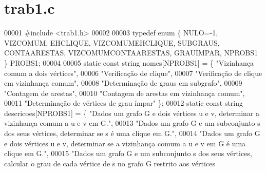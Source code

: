 \section{trab1.\+c}
\label{trab1_8c_source}

\begin{DoxyCode}
00001 \textcolor{preprocessor}{#include <trab1.h>}
00002 
00003 \textcolor{keyword}{typedef} \textcolor{keyword}{enum} \{ NULO=-1, VIZCOMUM, EHCLIQUE, VIZCOMUMEHCLIQUE, SUBGRAUS, CONTAARESTAS, VIZCOMUMCONTAARESTAS,
       GRAUIMPAR, NPROBS1 \} PROBS1;
00004 
00005 \textcolor{keyword}{static} \textcolor{keyword}{const} \textcolor{keywordtype}{string} nomes[NPROBS1] = \{  \textcolor{stringliteral}{"Vizinhança comum a dois vértices"},
00006                                                                                 \textcolor{stringliteral}{"Verificação de clique"},
00007                                                                                 \textcolor{stringliteral}{"Verificação de clique em
       vizinhança comum"},
00008                                                                                 \textcolor{stringliteral}{"Determinação de graus em
       subgrafo"},
00009                                                                                 \textcolor{stringliteral}{"Contagem de arestas"},
00010                                                                                 \textcolor{stringliteral}{"Contagem de arestas em
       vizinhança comum"},
00011                                                                                 \textcolor{stringliteral}{"Determinação de vértices
       de grau ímpar"} \};
00012 \textcolor{keyword}{static} \textcolor{keyword}{const} \textcolor{keywordtype}{string} descricoes[NPROBS1] = \{ \textcolor{stringliteral}{"Dados um grafo G e dois vértices u e v, determinar a
       vizinhança comum a u e v em G."},
00013                                                                                         \textcolor{stringliteral}{"Dados um grafo G e
       um subconjunto s dos seus vértices, determinar se s é uma clique em G."},
00014                                                                                         \textcolor{stringliteral}{"Dados um grafo G e
       dois vértices u e v, determinar se a vizinhança comum a u e v em G é uma clique em G."},
00015                                                                                         \textcolor{stringliteral}{"Dados um grafo G e
       um subconjunto s dos seus vértices, calcular o grau de cada vértice de s no grafo G restrito aos vértices
}
\end{DoxyCode}
